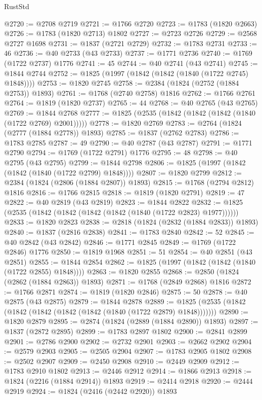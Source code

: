 \begin{lexlean}{RustStd}
\begin{coremodule}
{\begin{coremodule}
{{{{{{{{{{{{{{{{{{{{{{{{{{{{{{{{{{{{{{{{{{{{{{{@2720 := @2708 @2719
@2721 := @1766 @2720
@2723 := @1783 (@1820 @2663)
@2726 := @1783 (@1820 @2713) @1802
@2727 := @2723 @2726
@2729 := @2568 @2727 @1698
@2731 := @1837 (@2721 @2729)
@2732 := @1783 @2731
@2733 := 46
@2736 := @40 @2733 (@43 @2733)
@2737 := @1771 @2736
@2740 := @1769 (@1722 @2737) @1776
@2741 := 45
@2744 := @40 @2741 (@43 @2741)
@2745 := @1844 @2744
@2752 := @1825 (@1997 (@1842 (@1842 (@1840 (@1722 @2745) @1848))))
@2753 := @1820 @2745
@2758 := @2384 (@1824 (@2752 (@1884 @2753)) @1893)
@2761 := @1768 (@2740 @2758) @1816
@2762 := @1766 @2761
@2764 := @1819 (@1820 @2737)
@2765 := 44
@2768 := @40 @2765 (@43 @2765)
@2769 := @1844 @2768
@2777 := @1825 (@2535 (@1842 (@1842 (@1842 (@1840 (@1722 @2769) @2001)))))
@2778 := @1820 @2769
@2783 := @2764 (@1824 (@2777 (@1884 @2778)) @1893)
@2785 := @1837 (@2762 @2783)
@2786 := @1783 @2785
@2787 := 49
@2790 := @40 @2787 (@43 @2787)
@2791 := @1771 @2790
@2794 := @1769 (@1722 @2791) @1776
@2795 := 48
@2798 := @40 @2795 (@43 @2795)
@2799 := @1844 @2798
@2806 := @1825 (@1997 (@1842 (@1842 (@1840 (@1722 @2799) @1848))))
@2807 := @1820 @2799
@2812 := @2384 (@1824 (@2806 (@1884 @2807)) @1893)
@2815 := @1768 (@2794 @2812) @1816
@2816 := @1766 @2815
@2818 := @1819 (@1820 @2791)
@2819 := 47
@2822 := @40 @2819 (@43 @2819)
@2823 := @1844 @2822
@2832 := @1825 (@2535 (@1842 (@1842 (@1842 (@1842 (@1840 (@1722 @2823) @1977))))))
@2833 := @1820 @2823
@2838 := @2818 (@1824 (@2832 (@1884 @2833)) @1893)
@2840 := @1837 (@2816 @2838)
@2841 := @1783 @2840
@2842 := 52
@2845 := @40 @2842 (@43 @2842)
@2846 := @1771 @2845
@2849 := @1769 (@1722 @2846) @1776
@2850 := @1819 @1968
@2851 := 51
@2854 := @40 @2851 (@43 @2851)
@2855 := @1844 @2854
@2862 := @1825 (@1997 (@1842 (@1842 (@1840 (@1722 @2855) @1848))))
@2863 := @1820 @2855
@2868 := @2850 (@1824 (@2862 (@1884 @2863)) @1893)
@2871 := @1768 (@2849 @2868) @1816
@2872 := @1766 @2871
@2874 := @1819 (@1820 @2846)
@2875 := 50
@2878 := @40 @2875 (@43 @2875)
@2879 := @1844 @2878
@2889 := @1825 (@2535 (@1842 (@1842 (@1842 (@1842 (@1842 (@1840 (@1722 @2879) @1848)))))))
@2890 := @1820 @2879
@2895 := @2874 (@1824 (@2889 (@1884 @2890)) @1893)
@2897 := @1837 (@2872 @2895)
@2899 := @1783 @2897 @1802
@2900 := @2841 @2899
@2901 := @2786 @2900
@2902 := @2732 @2901
@2903 := @2662 @2902
@2904 := @2579 @2903
@2905 := @2505 @2904
@2907 := @1783 @2905 @1802
@2908 := @2502 @2907
@2909 := @2450 @2908
@2910 := @2449 @2909
@2912 := @1783 @2910 @1802
@2913 := @2446 @2912
@2914 := @1866 @2913
@2918 := @1824 (@2216 (@1884 @2914)) @1893
@2919 := @2414 @2918
@2920 := @2444 @2919
@2924 := @1824 (@2416 (@2442 @2920)) @1893
}}}}}}}}}}}}}}}}}}}}}}}}}}}}}}}}}}}}}}}}}}}}}}}
\end{coremodule}}
\end{coremodule}
\end{lexlean}
